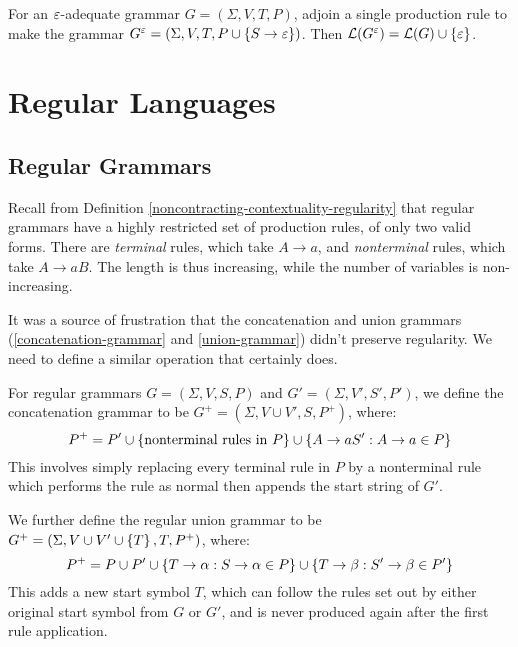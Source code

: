 \documentclass{article}
\begin{document}
\begin{corollary}
	For an $\varepsilon$-adequate grammar $G = (\Sigma, V, T, P)$, adjoin a single production rule to make the grammar $G^\varepsilon = (\Sigma, V, T, P \cup \left\lbrace S \to \varepsilon \right\rbrace)$. Then $\mathcal{L}(G^\varepsilon) = \mathcal{L}(G) \cup \left\lbrace \varepsilon \right\rbrace$.
\end{corollary}

\pagebreak
\section{Regular Languages}
\subsection{Regular Grammars}

Recall from Definition \ref{noncontracting-contextuality-regularity} that regular grammars have a highly restricted set of production rules, of only two valid forms. There are \textit{terminal} rules, which take $A \to a$, and \textit{nonterminal} rules, which take $A \to aB$. The length is thus increasing, while the number of variables is non-increasing.

It was a source of frustration that the concatenation and union grammars (\ref{concatenation-grammar} and \ref{union-grammar}) didn't preserve regularity. We need to define a similar operation that certainly does.

\begin{definition}
	\label{reg-concat-union}
	For regular grammars $G = (\Sigma, V, S, P)$ and $G' = (\Sigma, V', S', P')$, we define the concatenation grammar to be $G^+ = (\Sigma, V \cup V', S, P^+)$, where:
	\[
		P^+ = P' \cup \left\lbrace \text{nonterminal rules in } P \right\rbrace \cup \left\lbrace A \to aS': A \to a \in P \right\rbrace
	\]
	This involves simply replacing every terminal rule in $P$ by a nonterminal rule which performs the rule as normal then appends the start string of $G'$.
		
	We further define the regular union grammar to be $G^+ = (\Sigma, V \cup V' \cup \left\lbrace T \right\rbrace, T, P^+)$, where:
	\[
		P^+ = P \cup P' \cup \left\lbrace T \to \alpha: S \to \alpha \in P \right\rbrace \cup \left\lbrace T \to \beta: S' \to \beta \in P' \right\rbrace
	\]
	This adds a new start symbol $T$, which can follow the rules set out by either original start symbol from $G$ or $G'$, and is never produced again after the first rule application.
\end{definition}
\end{document}
